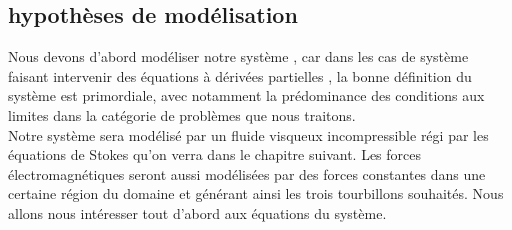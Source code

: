 \documentclass[a4paper,12pt,titlepage]{report}
\begin{document}
\begin{onehalfspace}
\subsection{hypothèses de modélisation}
Nous devons d'abord modéliser notre système , car dans les cas de système faisant intervenir des équations à dérivées partielles , la bonne définition du système est primordiale, avec notamment la prédominance des conditions aux limites dans la catégorie de problèmes que nous traitons. \\
Notre système sera modélisé par un fluide visqueux incompressible régi par les équations de Stokes qu’on verra dans le chapitre suivant. Les forces électromagnétiques seront aussi modélisées par des forces constantes dans une certaine région du domaine et générant ainsi les trois tourbillons souhaités. Nous allons nous intéresser tout d’abord aux équations du système.
\newpage

\end{onehalfspace}
\end{document}
